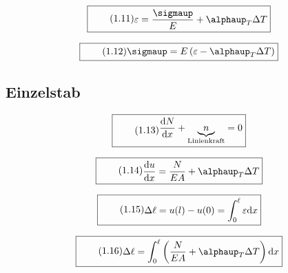 \documentclass[11pt]{article}
\newcommand{\1}{ {\mathds{1}} }
\renewcommand{\alpha  }{\mathit{\alphaup}   }
\renewcommand{\sigma  }{\sigmaup   }
\begin{document}
		\begin{equation}
			\boxed{
				\tag{1.11}
				\begin{split}
					\varepsilon
					=
					\frac{\sigma}{E}
					+
					\alpha_T
					\Delta T
				\end{split}
			}
		\end{equation}
		
		\begin{equation}
			\boxed{
				\tag{1.12}
				\begin{split}
					\sigma
					=
					E
					\left(
						\varepsilon
						-
						\alpha_T
						\Delta T
					\right)
				\end{split}
			}
		\end{equation}


		\subsection{Einzelstab}

		\begin{equation}
			\boxed{
				\tag{1.13}
				\begin{split}
					\frac{\text{d}N}
							 {\text{d}x}
					+
					\underbrace{n}_{\text{Linienkraft}}
					=
					0
				\end{split}
			}
		\end{equation}

		\begin{equation}
			\boxed{
				\tag{1.14}
				\begin{split}
					\frac{\text{d}u}
							 {\text{d}x}
					=
					\frac{N}{EA}
					+
					\alpha_T \Delta T
				\end{split}
			}
		\end{equation}

		\begin{equation}
			\boxed{
				\tag{1.15}
				\begin{split}
					\Delta \ell
					=
					u(l)
					-
					u(0)
					=
					\int_{0}^{\ell}
					\varepsilon
					\text{d}x
				\end{split}
			}
		\end{equation}
		 
		\begin{equation}
			\boxed{
				\tag{1.16}
				\begin{split}
					\Delta \ell
					=
					\int_{0}^{\ell}
					\left(
						\frac{N}{EA}
						+
						\alpha_T \Delta T
					\right)
					\text{d}x
				\end{split}
			}
		\end{equation}
\end{document}
